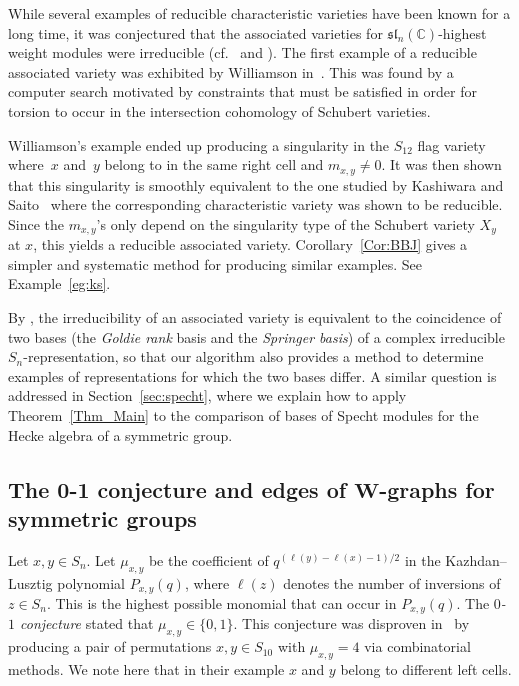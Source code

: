\documentclass[pdftex]{sigma}
\numberwithin{equation}{section}
\begin{document}
While several examples of reducible characteristic varieties have been known for a long time, it was conjectured that the associated varieties for $\mathfrak{sl}_n(\mathbb{C})$-highest weight modules were irreducible (cf.\ \cite[Conjecture~4.5]{BB} and \cite[Section~10.2]{J}). The first example of a reducible associated variety was exhibited by Williamson in~\cite{williamson}.
This was found by a computer search motivated by constraints that must be satisfied in order for torsion to occur in the intersection cohomology of Schubert varieties.

Williamson's example ended up producing a singularity in the $S_{12}$ flag variety where~$x$ and~$y$ belong to in the same right cell and $m_{x,y}\neq 0$. It was then shown that this singularity is smoothly equivalent to the one studied by Kashiwara and Saito~\cite{kashiwarasaito} where the corresponding characteristic variety was shown to be reducible. Since the $m_{x,y}$'s only depend on the singularity type of the Schubert variety $X_y$ at $x$, this yields a reducible associated variety.
Corollary~\ref{Cor:BBJ} gives a simpler and systematic method for producing similar examples. See Example~\ref{eg:ks}.

\begin{Remark}By \cite[Section~3.1(A)]{tanisaki}, the irreducibility of an associated variety is equivalent to the coincidence of two bases (the \emph{Goldie rank} basis and the \emph{Springer basis}) of a complex irreducible $S_n$-representation, so that our algorithm also provides a method to determine examples of representations for which the two bases differ. A similar question is addressed in Section~\ref{sec:specht}, where we explain how to apply Theorem~\ref{Thm_Main} to the comparison of bases of Specht modules for the Hecke algebra of a symmetric group.
\end{Remark}

\subsection[The 0-1 conjecture and edges of W-graphs for symmetric groups]{The 0-1 conjecture and edges of $\boldsymbol{W}$-graphs for symmetric groups}\label{Sec_01}

Let $x,y\in S_n$.
Let $\mu_{x,y}$ be the coefficient of $q^{(\ell(y)-\ell(x)-1)/2}$ in the Kazhdan--Lusztig polynomial $P_{x,y}(q)$, where $\ell(z)$ denotes the number of inversions of $z\in S_n$. This is the highest possible monomial that can occur in $P_{x,y}(q)$.
The \emph{$0$-$1$ conjecture} stated that $\mu_{x,y}\in \{0,1\}$. This conjecture was disproven in~\cite{mclarnanwarrington} by producing a pair of permutations $x,y\in S_{10}$ with $\mu_{x,y}=4$ via combinatorial methods. We note here that in their example $x$ and $y$ belong to different left cells.
\end{document}
